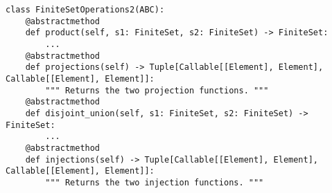 \par\begin{minipage}{95ex}
\begin{verbatim}
class FiniteSetOperations2(ABC):
    @abstractmethod
    def product(self, s1: FiniteSet, s2: FiniteSet) -> FiniteSet:
        ...
    @abstractmethod
    def projections(self) -> Tuple[Callable[[Element], Element], Callable[[Element], Element]]:
        """ Returns the two projection functions. """
    @abstractmethod
    def disjoint_union(self, s1: FiniteSet, s2: FiniteSet) -> FiniteSet:
        ...
    @abstractmethod
    def injections(self) -> Tuple[Callable[[Element], Element], Callable[[Element], Element]]:
        """ Returns the two injection functions. """
\end{verbatim}
\end{minipage}\par